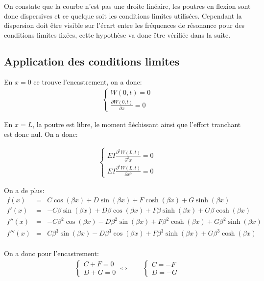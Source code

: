 \documentclass[a4paper,11pt]{report} %
\begin{document}
On constate que la courbe n'est pas une droite linéaire, les poutres en flexion sont donc dispersives et ce quelque soit les conditions limites utilisées. Cependant la dispersion doit être visible sur l'écart entre les fréquences de résonance pour des conditions limites fixées, cette hypothèse va donc être vérifiée dans la suite.

\subsection{Application des conditions limites}

En $x=0$ ce trouve l'encastrement, on a donc:
\begin{eqnarray*}
\begin{cases} W(0,t) = 0 \\ \frac{\partial W(0,t)}{\partial x} = 0 \end{cases}
\end{eqnarray*}

En $x=L$, la poutre est libre, le moment fléchissant ainsi que l'effort tranchant est donc nul. On a donc:

\begin{eqnarray*}
\begin{cases}  EI \frac{\partial ^2 W(L,t)}{\partial ^2 x} = 0 \\ EI \frac{\partial ^3 W(L,t)}{\partial x^3} = 0 \end{cases}
\end{eqnarray*}

On a de plus:
\begin{eqnarray*}
f(x) & = & C \cos(\beta x) + D \sin(\beta x) + F \cosh(\beta x) + G \sinh(\beta x) \\
f'(x) & = & -C \beta \sin(\beta x) + D \beta \cos(\beta x) + F \beta \sinh(\beta x) + G \beta \cosh(\beta x) \\
f''(x) & = & -C \beta ^2 \cos(\beta x) - D \beta ^2 \sin(\beta x) + F \beta ^2 \cosh(\beta x) + G \beta ^2 \sinh(\beta x) \\
f'''(x) & = & C \beta ^3 \sin(\beta x) - D \beta ^3 \cos(\beta x) + F \beta ^3 \sinh(\beta x) + G \beta ^3 \cosh(\beta x) \\
\end{eqnarray*}

On a donc pour l'encastrement:
\begin{eqnarray*}
\begin{cases} 
C + F = 0  \\ 
D + G = 0  
\end{cases}
\Leftrightarrow  \qquad
\begin{cases}
C = -F \\
D = -G 
\end{cases}
\end{eqnarray*}
\end{document}
